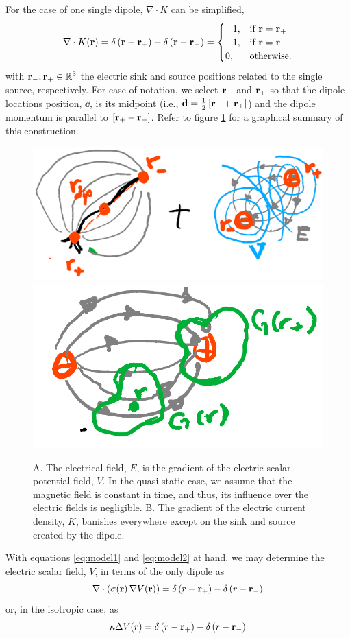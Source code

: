 For the case of one single dipole, $\nabla \cdot K$ can be simplified,
\begin{equation}
\nabla \cdot K(\mathbf{r}) = {\delta\left( \mathbf{r}-\mathbf{r}_+ \right) - \delta\left( \mathbf{r}-\mathbf{r}_- \right)} =
\begin{cases}
+1, &\text{if } \mathbf{r}=\mathbf{r}_+ \\
-1, &\text{if } \mathbf{r}=\mathbf{r}_- \\
0, &\text{otherwise}.
\end{cases}
\label{eq:model2}
\end{equation}
with $\mathbf{r}_-, \mathbf{r}_+ \in \mathbb{R}^3$ the electric sink and source positions related to the single source, respectively. 
%
For ease of notation, we select $\mathbf{r}_-$ and $\mathbf{r}_+$ so that the dipole locations position, $\dd$, is its midpoint (i.e., $\mathbf{d}= \frac{1}{2}\left[ \mathbf{r}_-+\mathbf{r}_+ \right]$) and the dipole momentum is parallel to $\left[ \mathbf{r}_+-\mathbf{r}_- \right]$.
%
Refer to figure \ref{fig:diagrams1} for a graphical summary of this construction.

\begin{figure}
\centering
\includegraphics[width=0.4\linewidth]{./img_dev/nsNeuronDipole}
\includegraphics[width=0.4\linewidth]{./img_dev/nsCurrDensField}
\caption{A. The electrical field, $E$, is the gradient of the electric scalar potential field, $V$. In the quasi-static case, we assume that the magnetic field is constant in time, and thus, its influence over the electric fields is negligible. B. The gradient of the electric current density, $K$, banishes everywhere except on the sink and source created by the dipole. }
\label{fig:diagrams1}
\end{figure}

With equations \eqref{eq:model1} and \eqref{eq:model2} at hand, we may determine the electric scalar field, $V$, in terms of the only dipole as
\begin{equation}
\nabla \cdot\left( \sigma(\mathbf{r})\, \nabla V(\mathbf{r})  \right) = 
{\delta\left( r-\mathbf{r}_+ \right) - \delta\left( r-\mathbf{r}_- \right)}
\label{eq:poisson_gral}
\end{equation}
or, in the isotropic case, as
\begin{equation}
\kappa \Delta V(r) = 
{\delta\left( r-\mathbf{r}_+ \right) - \delta\left( r-\mathbf{r}_- \right)}
\label{eq:poisson_isotropic}
\end{equation}


